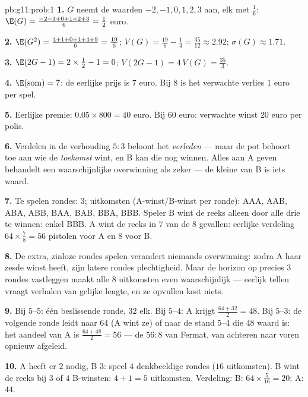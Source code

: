 \begin{solution}{pb:g11:prob:1}
\textbf{1.} $G$ neemt de waarden $-2, -1, 0, 1, 2, 3$ aan, elk met 
$\frac16$: $\E(G) = \frac{-2 - 1 + 0 + 1 + 2 + 3}{6} = \frac12$ euro.

\textbf{2.} $\E(G^2) = \frac{4 + 1 + 0 + 1 + 4 + 9}{6} = \frac{19}{6}$;
$V(G) = \frac{19}{6} - \frac14 = \frac{35}{12} \approx 2.92$;
$\sigma(G) \approx 1.71$.

\textbf{3.} $\E(2G - 1) = 2 \times \frac12 - 1 = 0$;
$V(2G - 1) = 4\,V(G) = \frac{35}{3}$.

\textbf{4.} $\E(\text{som}) = 7$: de eerlijke prijs is $7$ euro. Bij $8$ is
het verwachte verlies $1$ euro per spel.

\textbf{5.} Eerlijke premie: $0.05 \times 800 = 40$ euro. Bij $60$ euro:
verwachte winst $20$ euro per polis.

\textbf{6.} Verdelen in de verhouding $5:3$ beloont het \emph{verleden} ---
maar de pot behoort toe aan wie de \emph{toekomst} wint, en B kan die nog
winnen. Alles aan A geven behandelt een waarschijnlijke overwinning als
zeker --- de kleine  van B is iets waard.

\textbf{7.} Te spelen rondes: $3$; uitkomsten (A-winst/B-winst per ronde):
AAA, AAB, ABA, ABB, BAA, BAB, BBA, BBB. Speler B wint de reeks alleen door
alle drie te winnen: enkel BBB. A wint de reeks in $7$ van de $8$ gevallen:
eerlijke verdeling $64 \times \frac78 = 56$ pistolen voor A en $8$ voor B.

\textbf{8.} De extra, zinloze rondes spelen verandert niemands overwinning:
zodra A haar zesde winst heeft, zijn latere rondes plechtigheid. Maar de
horizon op precies $3$ rondes vastleggen maakt alle $8$ uitkomsten even
waarschijnlijk --- eerlijk tellen vraagt verhalen van gelijke lengte, en ze
opvullen kost niets.

\textbf{9.} Bij $5$--$5$: één beslissende ronde, $32$ elk. Bij $5$--$4$: A
krijgt $\frac{64 + 32}{2} = 48$. Bij $5$--$3$: de volgende ronde leidt naar
$64$ (A wint ze) of naar de stand $5$--$4$ die $48$ waard is: het aandeel van
A is $\frac{64 + 48}{2} = 56$ --- de $56 : 8$ van Fermat, van achteren naar
voren opnieuw afgeleid.

\textbf{10.} A heeft er $2$ nodig, B $3$: speel $4$ denkbeeldige rondes
($16$ uitkomsten). B wint de reeks bij $3$ of $4$ B-winsten:
$4 + 1 = 5$ uitkomsten. Verdeling: B: $64 \times \frac{5}{16} = 20$; A:
$44$.


\end{solution}
